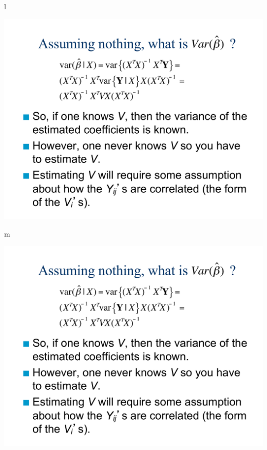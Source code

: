 \documentclass[ignorenonframetext,]{beamer}
\begin{document}
\begin{frame}{l}

\includegraphics[page=13,width=5.5in]{Chapter5AddSlides1.pdf}

\end{frame}

\begin{frame}{m}

\includegraphics[page=14,width=7in]{Chapter5AddSlides1.pdf}

\end{frame}
\end{document}
